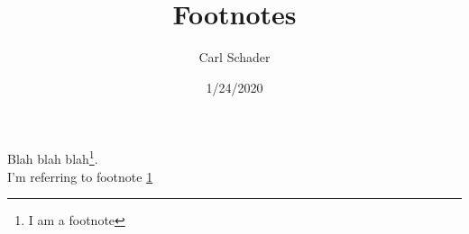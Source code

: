 \documentclass{article}
\title{Footnotes}
\date{1/24/2020}
\author{Carl Schader}
\begin{document}
	Blah blah blah\footnote{\label{myFootnote}I am a footnote}.\\ %
	I'm referring to footnote \ref{myFootnote}
\end{document}
